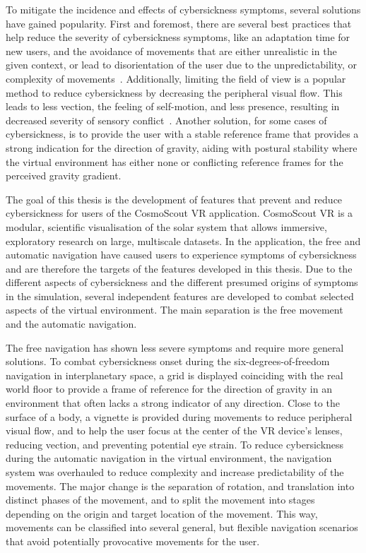 To mitigate the incidence and effects of cybersickness symptoms, several solutions have gained popularity.
First and foremost, there are several best practices that help reduce the severity of cybersickness symptoms, like an
adaptation time for new users, and the avoidance of movements that are either unrealistic in the given context, or
lead to disorientation of the user due to the unpredictability, or complexity of movements~\cite{McCauley1992}.
Additionally, limiting the field of view is a popular method to reduce cybersickness by decreasing the peripheral
visual flow.
This leads to less vection, the feeling of self-motion, and less presence, resulting in decreased severity of sensory
conflict~\cite{Duh2001}.
Another solution, for some cases of cybersickness, is to provide the user with a stable reference frame that provides a
strong indication for the direction of gravity, aiding with postural stability where the virtual environment has
either none or conflicting reference frames for the perceived gravity gradient.

The goal of this thesis is the development of features that prevent and reduce cybersickness for users of the
CosmoScout VR application.
CosmoScout VR is a modular, scientific visualisation of the solar system that allows immersive, exploratory research
on large, multiscale datasets.
In the application, the free and automatic navigation have caused users to experience symptoms of cybersickness and
are therefore the targets of the features developed in this thesis.
Due to the different aspects of cybersickness and the different presumed origins of symptoms in the simulation,
several independent features are developed to combat selected aspects of the virtual environment.
The main separation is the free movement and the automatic navigation.

The free navigation has shown less severe symptoms and require more general solutions.
To combat cybersickness onset during the six-degrees-of-freedom navigation in interplanetary space, a grid is
displayed coinciding with the real world floor to provide a frame of reference for the direction of gravity in an
environment that often lacks a strong indicator of any direction.
Close to the surface of a body, a vignette is provided during movements to reduce peripheral visual flow, and to help
the user focus at the center of the VR device's lenses, reducing vection, and preventing potential eye strain.
To reduce cybersickness during the automatic navigation in the virtual environment, the navigation system was
overhauled to reduce complexity and increase predictability of the movements.
The major change is the separation of rotation, and translation into distinct phases of the movement, and to split the
movement into stages depending on the origin and target location of the movement.
This way, movements can be classified into several general, but flexible navigation scenarios that avoid potentially
provocative movements for the user.

